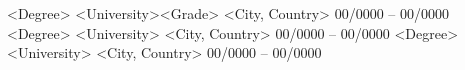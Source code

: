 \begin{cvhonors}
	\cvhonor
	{<Degree>}
	{<University>\enskip\cdotp\enskip <Grade>}
	{<City, Country>}
	{00/0000 -- 00/0000}
    \cvhonor
	{<Degree>}
	{<University>}
	{<City, Country>}
	{00/0000 -- 00/0000}
    \cvhonor
	{<Degree>}
	{<University>}
	{<City, Country>}
	{00/0000 -- 00/0000}
\end{cvhonors}



